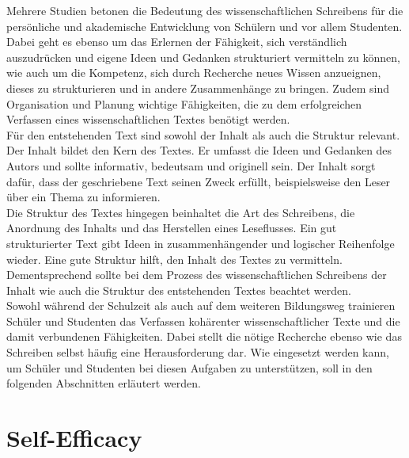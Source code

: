 \documentclass[../main.tex]{subfiles}
\begin{document}
Mehrere Studien betonen die Bedeutung des wissenschaftlichen Schreibens für die persönliche und akademische Entwicklung 
von Schülern und vor allem Studenten\cite{influencingUsingAi,ZukunftWissenschaftlichesPublizieren}. Dabei geht es ebenso um das Erlernen der Fähigkeit, sich verständlich auszudrücken und 
eigene Ideen und Gedanken strukturiert vermitteln zu können, wie auch um die Kompetenz, sich durch Recherche neues Wissen 
anzueignen, dieses zu strukturieren und in andere Zusammenhänge zu bringen. Zudem sind Organisation und Planung 
wichtige Fähigkeiten, die zu dem erfolgreichen Verfassen eines wissenschaftlichen Textes benötigt werden.\cite{SelfEfficacyBeliefs} \\
Für den entstehenden Text sind sowohl der Inhalt als auch die Struktur relevant. Der Inhalt bildet den Kern des Textes. Er umfasst die Ideen und Gedanken des Autors und sollte 
informativ, bedeutsam und originell sein. Der Inhalt sorgt dafür, dass der geschriebene Text seinen Zweck erfüllt, beispielsweise 
den Leser über ein Thema zu informieren. \\
Die Struktur des Textes hingegen beinhaltet die Art des Schreibens, die Anordnung des Inhalts und das Herstellen eines Leseflusses. 
Ein gut strukturierter Text gibt Ideen in zusammenhängender und logischer Reihenfolge wieder. Eine gute Struktur hilft, den Inhalt des
Textes zu vermitteln. Dementsprechend sollte bei dem Prozess des wissenschaftlichen Schreibens der Inhalt wie auch die Struktur des entstehenden 
Textes beachtet werden.\cite{teachers}\\
Sowohl während der Schulzeit als auch auf dem weiteren Bildungsweg trainieren Schüler und Studenten das Verfassen kohärenter 
wissenschaftlicher Texte und die damit verbundenen Fähigkeiten. Dabei stellt die nötige Recherche ebenso wie das Schreiben selbst
häufig eine Herausforderung dar. Wie  eingesetzt werden kann, um Schüler und Studenten bei diesen Aufgaben zu 
unterstützen, soll in den folgenden Abschnitten erläutert werden. 

\section{Self-Efficacy}
\label{sec:efficacy}
\end{document}
